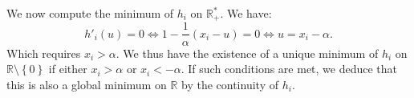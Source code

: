 \documentclass{article}
\begin{document}
\begin{itemize}
           We now compute the minimum of $h_{i}$ on
           $\mathbb{R}_{+}^{*}$.
           We have:
           \begin{equation*}
               h'_{i}\left(u\right) = 0 \Longleftrightarrow
               1 - \frac{1}{\alpha}\left(x_{i} - u\right) = 0
               \Longleftrightarrow u = x_{i} - \alpha.
           \end{equation*}
           Which requires $x_{i} > \alpha$.
           We thus have the existence of 
           a unique minimum of $h_{i}$ on
           $\mathbb{R} \setminus \left\{0\right\}$
           if either $x_{i} > \alpha$ or
           $x_{i} < - \alpha$.
           If such conditions are met, 
           we deduce that this is also
           a global minimum on $\mathbb{R}$ 
           by the continuity of $h_{i}$.


\end{itemize}
\end{document}
